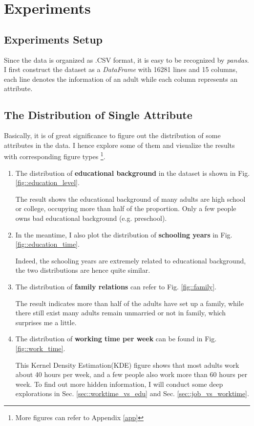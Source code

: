 \documentclass[12pt,a4paper]{article}
\theoremstyle{definition}
\begin{document}
\section{Experiments}

\subsection{Experiments Setup}

Since the data is organized as .CSV format, it is easy to be recognized by \textit{pandas}. I first construct the dataset as a \textit{DataFrame} with 16281 lines and 15 columns, each line denotes the information of an adult while each column represents an attribute.

\subsection{The Distribution of Single Attribute}

Basically, it is of great significance to figure out the distribution of some attributes in the data. I hence explore some of them and visualize the results with corresponding figure types \footnote{More figures can refer to Appendix \ref{app}}.

\begin{enumerate}
\item The distribution of \textbf{educational background} in the dataset is shown in Fig. \ref{fig::education_level}.

The result shows the educational background of many adults are high school or college, occupying more than half of the proportion. Only a few people owns bad educational background (e.g. preschool).

\item In the meantime, I also plot the distribution of \textbf{schooling years} in Fig. \ref{fig::education_time}.

Indeed, the schooling years are extremely related to educational background, the two distributions are hence quite similar.

\item The distribution of \textbf{family relations} can refer to Fig. \ref{fig::family}.

The result indicates more than half of the adults have set up a family, while there still exist many adults remain unmarried or not in family, which surprises me a little.

\item The distribution of \textbf{working time per week} can be found in Fig. \ref{fig::work_time}.

This Kernel Density Estimation(KDE) figure shows that most adults work about 40 hours per week, and a few people also work more than 60 hours per week. To find out more hidden information, I will conduct some deep explorations in Sec. \ref{sec::worktime_vs_edu} and Sec. \ref{sec::job_vs_worktime}.

\end{enumerate}
\end{document}
